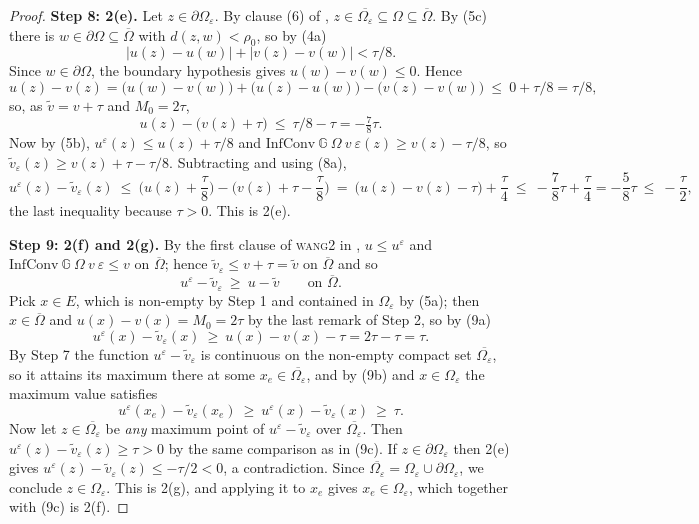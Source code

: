 \begin{proof}
\medskip\noindent\textbf{Step 8: 2(e).} Let $z\in\partial\Omega_\varepsilon$. By clause (6)
of ,
$z\in\overline{\Omega_\varepsilon}\subseteq\Omega\subseteq\overline\Omega$. By (5c) there is
$w\in\partial\Omega\subseteq\overline\Omega$ with $d(z,w)<\rho_0$, so by (4a)
\[
 |u(z)-u(w)|+|v(z)-v(w)|<\tau/8 .
\]
Since $w\in\partial\Omega$, the boundary hypothesis gives $u(w)-v(w)\le0$. Hence
\[
 u(z)-v(z)=\big(u(w)-v(w)\big)+\big(u(z)-u(w)\big)-\big(v(z)-v(w)\big)
 \ \le\ 0+\tau/8=\tau/8,
\]
so, as $\tilde v=v+\tau$ and $M_0=2\tau$,
\[
 u(z)-\big(v(z)+\tau\big)\ \le\ \tau/8-\tau=-\tfrac78\tau . \tag{8a}
\]
Now by (5b), $u^{\varepsilon}(z)\le u(z)+\tau/8$ and
$\mathrm{InfConv}\ \mathbb G\ \Omega\ v\ \varepsilon(z)\ge v(z)-\tau/8$, so
$\tilde v_{\varepsilon}(z)\ge v(z)+\tau-\tau/8$. Subtracting and using (8a),
\[
 u^{\varepsilon}(z)-\tilde v_{\varepsilon}(z)
 \ \le\ \Big(u(z)+\frac\tau8\Big)-\Big(v(z)+\tau-\frac\tau8\Big)
 \ =\ \big(u(z)-v(z)-\tau\big)+\frac\tau4
 \ \le\ -\frac78\tau+\frac\tau4=-\frac58\tau\ \le\ -\frac\tau2 ,
\]
the last inequality because $\tau>0$. This is 2(e).

\medskip\noindent\textbf{Step 9: 2(f) and 2(g).} By the first clause of \textsc{wang2} in
, $u\le u^{\varepsilon}$ and
$\mathrm{InfConv}\ \mathbb G\ \Omega\ v\ \varepsilon\le v$ on $\overline\Omega$; hence
$\tilde v_{\varepsilon}\le v+\tau=\tilde v$ on $\overline\Omega$ and so
\[
 u^{\varepsilon}-\tilde v_{\varepsilon}\ \ge\ u-\tilde v\qquad\text{on }\overline\Omega. \tag{9a}
\]
Pick $x\in E$, which is non-empty by Step 1 and contained in $\Omega_\varepsilon$ by (5a);
then $x\in\overline\Omega$ and $u(x)-v(x)=M_0=2\tau$ by the last remark of Step 2, so
by (9a)
\[
 u^{\varepsilon}(x)-\tilde v_{\varepsilon}(x)\ \ge\ u(x)-v(x)-\tau=2\tau-\tau=\tau. \tag{9b}
\]
By Step 7 the function $u^{\varepsilon}-\tilde v_{\varepsilon}$ is continuous on the
non-empty compact set $\overline{\Omega_\varepsilon}$, so it attains its maximum there at
some $x_e\in\overline{\Omega_\varepsilon}$, and by (9b) and $x\in\Omega_\varepsilon$ the
maximum value satisfies
\[
 u^{\varepsilon}(x_e)-\tilde v_{\varepsilon}(x_e)\ \ge\ u^{\varepsilon}(x)-\tilde v_{\varepsilon}(x)\ \ge\ \tau. \tag{9c}
\]
Now let $z\in\overline{\Omega_\varepsilon}$ be \emph{any} maximum point of
$u^{\varepsilon}-\tilde v_{\varepsilon}$ over $\overline{\Omega_\varepsilon}$. Then
$u^{\varepsilon}(z)-\tilde v_{\varepsilon}(z)\ge\tau>0$ by the same comparison as in (9c).
If $z\in\partial\Omega_\varepsilon$ then 2(e) gives
$u^{\varepsilon}(z)-\tilde v_{\varepsilon}(z)\le-\tau/2<0$, a contradiction. Since
$\overline{\Omega_\varepsilon}=\Omega_\varepsilon\cup\partial\Omega_\varepsilon$, we conclude
$z\in\Omega_\varepsilon$. This is 2(g), and applying it to $x_e$ gives
$x_e\in\Omega_\varepsilon$, which together with (9c) is 2(f).


\end{proof}
